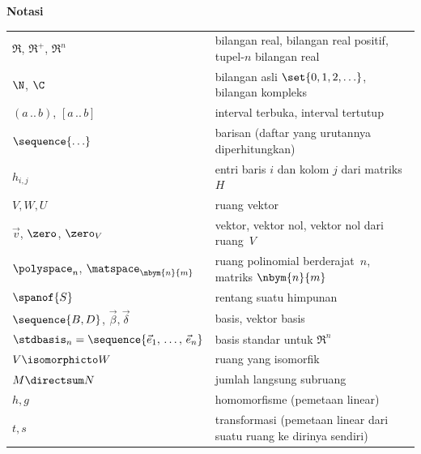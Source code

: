 \thispagestyle{empty}
\vspace*{\fill}
\begin{center}
  \textbf{Notasi}  \\[2ex]
  {\renewcommand{\arraystretch}{1.15}%
  \begin{tabular}{@{}>{\raggedleft\arraybackslash}p{}|>{\raggedright\arraybackslash}p{}@{}}
    \( \Re \), \( \Re^+ \), \( \Re^n \) &bilangan real, bilangan real positif, tupel-$n$ bilangan real \\
    \( \N              \),
    \( \C              \)  &bilangan asli \( \set{0,1,2,\ldots} \), bilangan kompleks                           \\
    \( (a\,..\,b) \), \( [a\,..\,b] \) &interval terbuka, interval tertutup   \\
    \( \sequence{\ldots} \)&barisan (daftar yang urutannya diperhitungkan)    \\
    \( h_{i,j} \)          &entri baris \( i \) dan kolom \( j \) dari matriks~$H$ \\
    \( V,W,U \)            &ruang vektor               \\
    \( \vec{v} \),
    $\zero$, $\zero_V$     &vektor, vektor nol, vektor nol dari ruang~$V$   \\
    \( \polyspace_n \), \( \matspace_{\nbym{n}{m}} \)  
                          &ruang polinomial berderajat~\( n \), matriks \( \nbym{n}{m} \)      \\
    \( \spanof{S} \)       &rentang suatu himpunan                   \\
    \( \sequence{B,D} \), \( \vec{\beta},\vec{\delta} \)         
                          &basis, vektor basis  \\
    \( \stdbasis_n=\sequence{\vec{e}_1,\,\ldots,\,\vec{e}_n} \)         
                          &basis standar untuk $\Re^n$  \\
    \( V\isomorphicto W \) &ruang yang isomorfik                         \\
    \( M\directsum N \)    &jumlah langsung subruang                   \\
    \( h,g \)              &homomorfisme (pemetaan linear)                \\
    \( t,s \)              &transformasi (pemetaan linear dari suatu ruang ke dirinya sendiri) \\

\end{tabular}}
\end{center}
